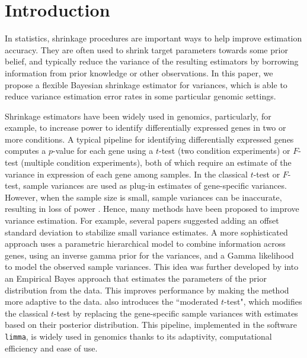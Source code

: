 \documentclass{bioinfo}
\begin{document}
\maketitle

\section{Introduction}


In statistics, shrinkage procedures are important ways to help improve estimation accuracy. They are often used to shrink target parameters towards some prior belief, and typically reduce the variance of the resulting estimators by borrowing information from prior knowledge or other observations. In this paper, we propose a flexible Bayesian shrinkage estimator for variances, which is able to reduce variance estimation error rates in some particular genomic settings. 

Shrinkage estimators have been widely used in genomics, particularly, for example, to increase power to identify differentially expressed genes in two or more conditions. A typical pipeline for identifying differentially expressed genes computes a $p$-value for each gene using a $t$-test (two condition experiments) or $F$-test (multiple condition experiments), both of which require an estimate of the variance in expression of each gene among samples. In the classical $t$-test or $F$-test, sample variances are used as plug-in estimates of gene-specific variances. However, when the sample size is small, sample variances can be inaccurate, resulting in loss of power \citep{murie2009}.  Hence, many methods have been proposed to improve variance estimation. For example, several papers \citep{tusher2001,efron2001eb,broberg2003} suggested adding an offset standard deviation to stabilize small variance estimates. A more sophisticated approach \citep{baldi2001} uses a parametric hierarchical model to combine information across genes, using an inverse gamma prior for the variances, and a Gamma likelihood to model the observed sample variances. This idea was further developed by \citet{smyth2004limma} into an Empirical Bayes approach that estimates the parameters of the prior distribution from the data. This improves performance by making the method more adaptive to the data. \citet{smyth2004limma} also introduces 
the ``moderated $t$-test",  which modifies the classical $t$-test by replacing the gene-specific sample variances with estimates based on their posterior distribution.
This pipeline, implemented in the software {\tt limma}, is widely used in genomics thanks to its adaptivity, computational efficiency and ease of use.
  
\end{document}

